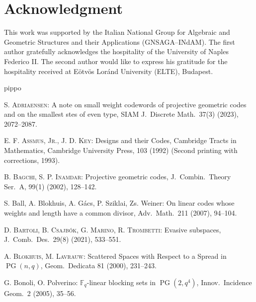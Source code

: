 \documentclass[12pt]{article}
\newcommand{\F}{{\mathbb F}}
\DeclareMathOperator{\PG}{{PG}}
\begin{document}
	\section{Acknowledgment}
	This work was supported by the Italian National Group for Algebraic and Geometric Structures and their Applications (GNSAGA–INdAM). The first author gratefully acknowledges the hospitality of the University of Naples Federico II. The second author would like to express his gratitude for the hospitality received at E\"otv\"os Lor\'and University (ELTE), Budapest.
	
	
	
	
	\begin{thebibliography}{pippo}
		
		
		
		\textsc{S. Adriaensen:} A note on small weight codewords of projective geometric codes and on the smallest stes of even type, SIAM J.\ Discrete Math.\ 37(3)  (2023), 2072--2087.
		
		\textsc{E. F. Assmus, Jr., J. D. Key:} Designs and their Codes, Cambridge Tracts in Mathematics, Cambridge
		University Press, 103 (1992) (Second printing with corrections, 1993).
		
		
		\textsc{B. Bagchi, S. P. Inamdar:} Projective geometric codes, J.\ Combin.\ Theory Ser.\ A, 99(1) (2002), 128--142.
		
		{\sc S. Ball, A. Blokhuis, A. G\'acs, P. Sziklai, Zs. Weiner:} On linear codes whose weights and length have a common divisor, Adv.\ Math.\ 211 (2007), 94--104.
		
		
		
		\textsc{D. Bartoli, B. Csajbók, G. Marino, R. Trombetti:} Evasive subspaces, J.\ Comb.\ Des.\ 29(8) (2021), 533--551. 
		
		\textsc{A. Blokhuis, M. Lavrauw:} Scattered Spaces with Respect to a Spread in $\PG(n,q)$, Geom.\ Dedicata 81 (2000), 231--243.
		
		{\sc G. Bonoli, O. Polverino:} $\F_q$-linear blocking sets in $\PG(2, q^4)$, Innov.\  Incidence Geom.\ 2 (2005), 35--56.
		

\end{thebibliography}
\end{document}
